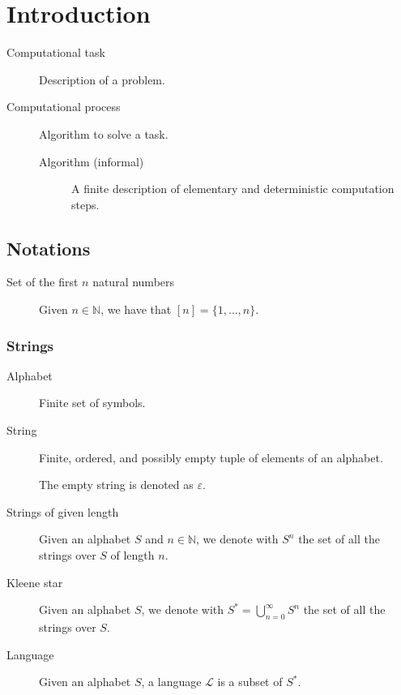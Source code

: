 \chapter{Introduction}

\begin{description}
    \item[Computational task] 
        Description of a problem.

    \item[Computational process] 
        Algorithm to solve a task.

        \begin{description}
            \item[Algorithm (informal)] 
                A finite description of 
                elementary and deterministic computation steps. 
        \end{description}
\end{description}


\section{Notations}

\begin{description}
    \item[Set of the first $n$ natural numbers]
        Given $n \in \mathbb{N}$, we have that $[n] = \{ 1, \dots, n \}$.
\end{description}


\subsection{Strings}

\begin{description}
    \item[Alphabet]  
        Finite set of symbols.
    
    \item[String]  
        Finite, ordered, and possibly empty tuple of elements of an alphabet.

        The empty string is denoted as $\varepsilon$.
    
    \item[Strings of given length]
        Given an alphabet $S$ and $n \in \mathbb{N}$, we denote with $S^n$ the set of all the strings over $S$ of length $n$.

    \item[Kleene star] 
        Given an alphabet $S$, we denote with $S^* = \bigcup_{n=0}^{\infty} S^n$ the set of all the strings over $S$.

    \item[Language] 
        Given an alphabet $S$, a language $\mathcal{L}$ is a subset of $S^*$.
\end{description}


